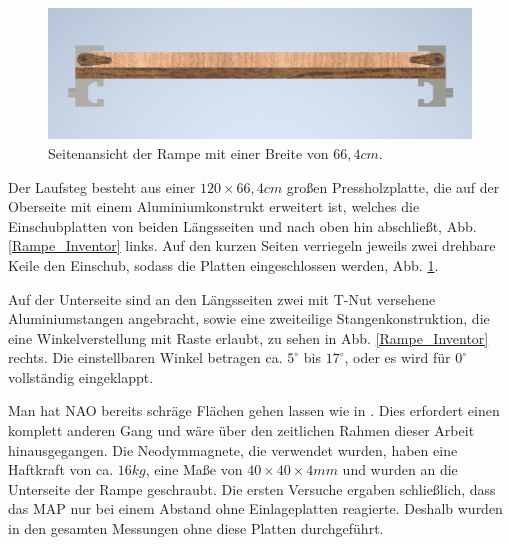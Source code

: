 \begin{figure}
	\vspace{-0.5cm}
	\centering
	\includegraphics[width=\linewidth]{Bilder/Rampe_Seitenansicht3.png}
	\caption{Seitenansicht der Rampe mit einer Breite von $66,4 \unit{cm}$.}
	\label{Rampe_Seite_Inventor}
	\vspace{-0.5cm}
\end{figure}

Der Laufsteg besteht aus einer $120\times66,4 \unit{cm}$ großen Pressholzplatte, die auf der Oberseite mit einem Aluminiumkonstrukt erweitert ist, welches die Einschubplatten von beiden Längsseiten und nach oben hin abschließt, Abb. \ref{Rampe_Inventor} links. Auf den kurzen Seiten verriegeln jeweils zwei drehbare Keile den Einschub, sodass die Platten eingeschlossen werden, Abb. \ref{Rampe_Seite_Inventor}.

Auf der Unterseite sind an den Längsseiten zwei mit T-Nut versehene Aluminiumstangen angebracht, sowie eine zweiteilige Stangenkonstruktion, die eine Winkelverstellung mit Raste erlaubt, zu sehen in Abb. \ref{Rampe_Inventor} rechts. Die einstellbaren Winkel betragen ca. $5^\circ$ bis $17^\circ$, oder es wird für $0^\circ$ vollständig eingeklappt.
  
Man hat NAO bereits schräge Flächen gehen lassen wie in \cite{Lutz_naowalking}. Dies erfordert einen komplett anderen Gang und wäre über den zeitlichen Rahmen dieser Arbeit hinausgegangen. Die Neodymmagnete, die verwendet wurden, haben eine Haftkraft von ca. $16 \unit{kg}$, eine Maße von $40\times40\times4 \unit{mm}$ \cite{schraubmagnet} und wurden an die Unterseite der Rampe geschraubt. Die ersten Versuche ergaben schließlich, dass das MAP nur bei einem Abstand ohne Einlageplatten reagierte. Deshalb wurden in den gesamten Messungen ohne diese Platten durchgeführt. 

\FloatBarrier


